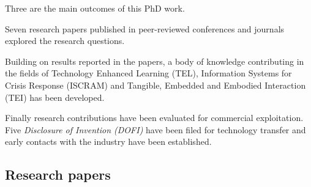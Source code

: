 Three are the main outcomes of this PhD work.

Seven research papers published in peer-reviewed conferences and journals explored the research questions.

Building on results reported in the papers, a body of knowledge contributing in the fields of Technology Enhanced Learning (TEL), Information Systems for Crisis Response (ISCRAM) and Tangible, Embedded and Embodied Interaction (TEI) has been developed.

Finally research contributions have been evaluated for commercial exploitation. Five \emph{Disclosure of Invention (DOFI)} have been filed for technology transfer and early contacts with the industry have been established.

\subsection{Research papers}\label{research-papers}


